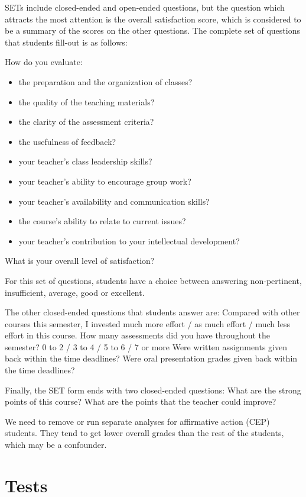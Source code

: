 \documentclass[12pt]{article}
\begin{document}
SETs include closed-ended and open-ended questions, but the question which attracts the most attention is the overall 
satisfaction score, which is considered to be a summary of the scores on the other questions. The complete set of questions 
that students fill-out is as follows:

How do you evaluate:
\begin{itemize}
\item the preparation and the organization of classes?    
\item the quality of the teaching materials?
\item the clarity of the assessment criteria?
\item the usefulness of feedback?
\item your teacher's class leadership skills?
\item your teacher's ability to encourage group work? 
\item your teacher's availability and communication skills?
\item the course's ability to relate to current issues?
\item your teacher's contribution to your intellectual development?
\end{itemize}

What is your overall level of satisfaction?

For this set of questions, students have a choice between answering non-pertinent, insufficient, average, good or excellent.

The other closed-ended questions that students answer are:
Compared with other courses this semester, I invested much more effort / as much effort / much less effort in this course. 
How many assessments did you have throughout the semester? 0 to 2 / 3 to 4 / 5 to 6 / 7 or more
Were written assignments given back within the time deadlines?
Were oral presentation grades given back within the time deadlines? 

Finally, the SET form ends with two closed-ended questions: 
What are the strong points of this course? 
What are the points that the teacher could improve?      


We need to remove or run separate analyses for affirmative action (CEP) students. They tend to get lower overall 
grades than the rest of the students, which may be a confounder.

\section{Tests}
\end{document}
